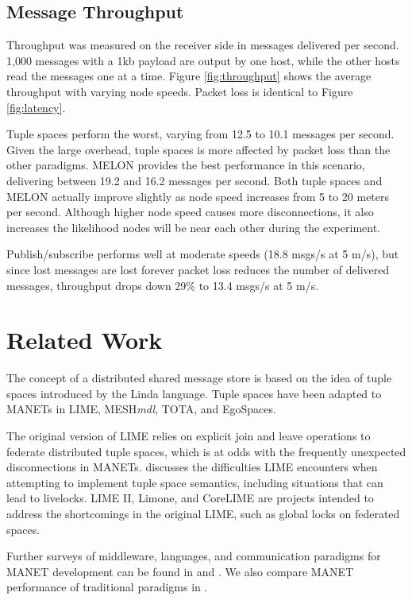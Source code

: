 \documentclass[lnicst]{svmultln}
\begin{document}
\subsection{Message Throughput}

Throughput was measured on the receiver side in messages delivered per second. 1,000 messages with a 1kb payload are output by one host, while the other hosts read the messages one at a time. Figure \ref{fig:throughput} shows the average throughput with varying node speeds. Packet loss is identical to Figure \ref{fig:latency}.

Tuple spaces perform the worst, varying from 12.5 to 10.1 messages per second. Given the large overhead, tuple spaces is more affected by packet loss than the other paradigms. MELON provides the best performance in this scenario, delivering between 19.2 and 16.2 messages per second. Both tuple spaces and MELON actually improve slightly as node speed increases from 5 to 20 meters per second. Although higher node speed causes more disconnections, it also increases the likelihood nodes will be near each other during the experiment.

Publish/subscribe performs well at moderate speeds (18.8 msgs/s at 5 m/s), but since lost messages are lost forever packet loss reduces the number of delivered messages, throughput drops down 29\% to 13.4 msgs/s at 5 m/s.

\section{Related Work}\label{sec:relatedwork}

The concept of a distributed shared message store is based on the idea of tuple spaces introduced by the Linda\cite{linda} language. Tuple spaces have been adapted to MANETs in LIME\cite{lime}, MESH\textit{mdl}\cite{meshmdl}, TOTA\cite{tota}, and EgoSpaces\cite{egospaces}.

The original version of LIME relies on explicit join and leave operations to federate distributed tuple spaces, which is at odds with the frequently unexpected disconnections in MANETs. \cite{limerevisted} discusses the difficulties LIME encounters when attempting to implement tuple space semantics, including situations that can lead to livelocks. LIME II\cite{lime2}, Limone\cite{limone}, and CoreLIME\cite{corelime} are projects intended to address the shortcomings in the original LIME, such as global locks on federated spaces.

Further surveys of middleware, languages, and communication paradigms for MANET development can be found in \cite{mine} and \cite{mwtrends}. We also compare MANET performance of traditional paradigms in \cite{collins2010quantitative}.
\end{document}
